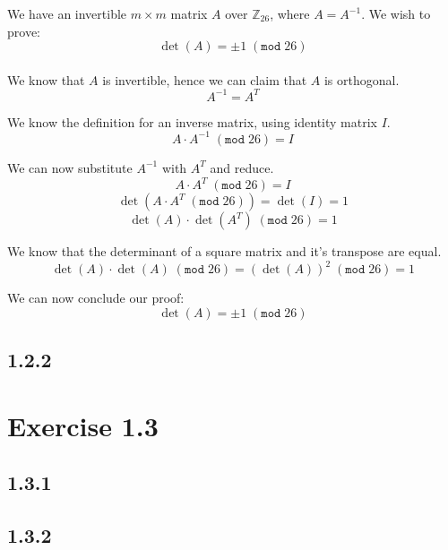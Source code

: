 \documentclass[11pt]{report}
\begin{document}
We have an invertible $m \times m$ matrix $A$ over $\mathbb{Z}_{26}$, where $A = A^{-1}$. We wish to prove:
$$\det(A) = \pm 1\;(\mathtt{mod}\;26)$$
\\
We know that $A$ is invertible, hence we can claim that $A$ is orthogonal.
$$A^{-1}=A^T$$

We know the definition for an inverse matrix, using identity matrix $I$.
$$A \cdot A^{-1}\;(\mathtt{mod}\;26) = I$$

We can now substitute $A^{-1}$ with $A^T$ and reduce.
$$A \cdot A^T\;(\mathtt{mod}\;26)= I$$
$$\det(A \cdot A^T\;(\mathtt{mod}\;26)) = \det(I) = 1$$
$$\det(A) \cdot \det(A^T)\;(\mathtt{mod}\;26) = 1$$

We know that the determinant of a square matrix and it's transpose are equal.
$$\det(A) \cdot \det(A)\;(\mathtt{mod}\;26) = (\det(A))^2\;(\mathtt{mod}\;26) = 1$$

We can now conclude our proof:
$$\det(A) = \pm 1\;(\mathtt{mod}\;26)$$

\subsection*{1.2.2}

\section*{Exercise 1.3}
\subsection*{1.3.1}

\subsection*{1.3.2}
\end{document}
